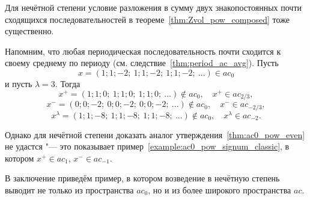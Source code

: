 Для нечётной степени условие разложения в сумму двух знакопостоянных почти сходящихся последовательностей в теореме~\ref{thm:Zvol_pow_composed} тоже существенно.

\begin{example}
	Напомним,
	что любая периодическая последовательность почти сходится к своему среднему по периоду
	(см. следствие~\ref{thm:period_ac_avg}).
	Пусть
	\begin{equation}
		x = (1;1;-2;\ 1;1;-2;\ 1;1;-2;\ ...) \in ac_0
	\end{equation}
	и пусть $\lambda = 3$.
	Тогда
	\begin{equation}
		x^+ = (1;1;0;\ 1;1;0;\ 1;1;0;\ ...) \notin ac_0, \quad x^+ \in ac_{2/3}
		,
	\end{equation}
	\begin{equation}
		x^- = (0;0;-2;\ 0;0;-2;\ 0;0;-2;\ ...) \notin ac_0, \quad x^- \in ac_{-2/3}
		,
	\end{equation}
	\begin{equation}
		x^\lambda = (1;1;-8;\ 1;1;-8;\ 1;1;-8;\ ...) \notin ac_0, \quad x^\lambda \in ac_{-2}
		.
	\end{equation}
\end{example}

Однако для нечётной степени доказать аналог утверждения~\ref{thm:ac0_pow_even} не удастся "--- это показывает пример~\ref{example:ac0_pow_signum_classic}, в котором $x^+\in ac_1$, $x^-\in ac_{-1}$.

В заключение приведём пример, в котором возведение в нечётную степень выводит не только из пространства $ac_0$,
но и из более широкого пространства $ac$.

